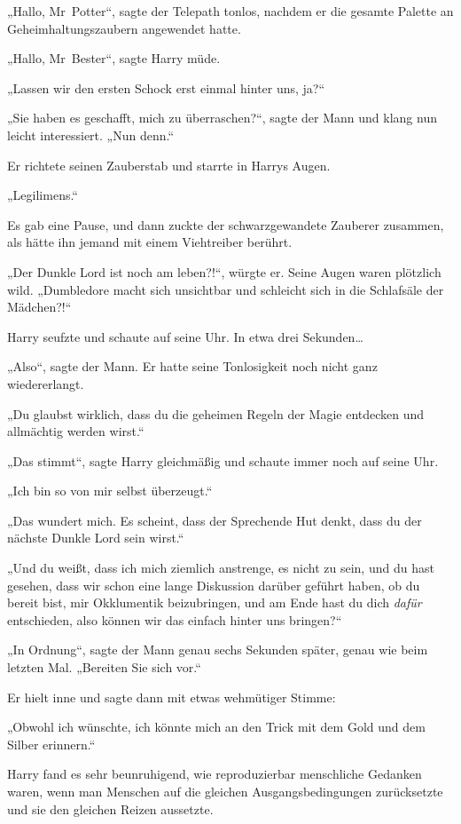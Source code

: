 {„Hallo, Mr~Potter“, sagte der Telepath tonlos, nachdem er die gesamte Palette an Geheimhaltungszaubern angewendet hatte.

„Hallo, Mr~Bester“, sagte Harry müde.

„Lassen wir den ersten Schock erst einmal hinter uns, ja?“

„Sie haben es geschafft, mich zu überraschen?“, sagte der Mann und klang nun leicht interessiert. „Nun denn.“

Er richtete seinen Zauberstab und starrte in Harrys Augen.

„Legilimens.“

Es gab eine Pause, und dann zuckte der schwarzgewandete Zauberer zusammen, als hätte ihn jemand mit einem Viehtreiber berührt.

„Der Dunkle Lord ist noch am leben?!“, würgte er. Seine Augen waren plötzlich wild. „Dumbledore macht sich unsichtbar und schleicht sich in die Schlafsäle der Mädchen?!“

Harry seufzte und schaute auf seine Uhr. In etwa drei Sekunden…

„Also“, sagte der Mann. Er hatte seine Tonlosigkeit noch nicht ganz wiedererlangt.

„Du glaubst wirklich, dass du die geheimen Regeln der Magie entdecken und allmächtig werden wirst.“

„Das stimmt“, sagte Harry gleichmäßig und schaute immer noch auf seine Uhr.

„Ich bin so von mir selbst überzeugt.“

„Das wundert mich. Es scheint, dass der Sprechende Hut denkt, dass du der nächste Dunkle Lord sein wirst.“

„Und du weißt, dass ich mich ziemlich anstrenge, es nicht zu sein, und du hast gesehen, dass wir schon eine lange Diskussion darüber geführt haben, ob du bereit bist, mir Okklumentik beizubringen, und am Ende hast du dich \emph{dafür} entschieden, also können wir das einfach hinter uns bringen?“

„In Ordnung“, sagte der Mann genau sechs Sekunden später, genau wie beim letzten Mal. „Bereiten Sie sich vor.“

Er hielt inne und sagte dann mit etwas wehmütiger Stimme:

„Obwohl ich wünschte, ich könnte mich an den Trick mit dem Gold und dem Silber erinnern.“

Harry fand es sehr beunruhigend, wie reproduzierbar menschliche Gedanken waren, wenn man Menschen auf die gleichen Ausgangsbedingungen zurücksetzte und sie den gleichen Reizen aussetzte.

}
